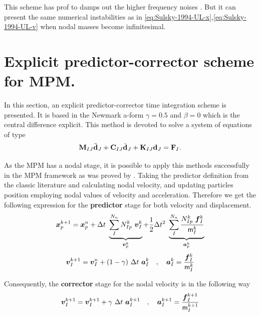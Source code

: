 This scheme has prof to damps out the higher frequency noises
\cite{Tran2019e}. But it can present the same numerical instabilities
as in \eqref{eq:Sulsky-1994-UL-x},\eqref{eq:Sulsky-1994-UL-v} when
nodal masses become infinitesimal.

\section{Explicit predictor-corrector scheme for MPM.}
\label{sec:epc-algor-mpm}

In this section, an explicit predictor-corrector time integration
scheme is presented. It is based in the Newmark a-form 
$\gamma = 0.5$ and $\beta = 0$ which is the central difference
explicit. This method is devoted to solve a system of equations of type
\begin{equation*}
  \mathbf{{M}}_{IJ}\ddot{\mathbf{{d}}}_{J} + \mathbf{{C}}_{IJ}\dot{\mathbf{{d}}}_{J} +
  \mathbf{{K}}_{IJ}\mathbf{{d}}_{J} = \mathbf{{F}}_{I}.
\end{equation*}

As the MPM has a nodal stage, it is possible to apply this methods
successfully in the MPM framework as was proved by
\cite{Tran2019e}. Taking the predictor definition from the classic
literature \cite{Hughes2000} and calculating nodal velocity, and
updating particles position employing nodal values of velocity and
acceleration. Therefore we get the following expression for the
\textbf{predictor} stage for both velocity and displacement.
\begin{equation}
  \label{eq:5}
  \vec{x}_p^{k+1} = \vec{x}_p^n + \Delta t\
  \underbrace{\sum^{N_n}_{I}N_{Ip}^k\ \vec{v}_{I}^{k}}_{\vec{v}_p^{k}} + \frac{1}{2}\Delta
  t^2\ \underbrace{\sum^{N_n}_{I}\frac{N_{Ip}^k\ \vec{f}_{I}^{k}}{\tens{m}_I^k}}_{\vec{a}_p^{k}}
\end{equation}
\begin{equation}
  \label{eq:Predictor-velocity}
  \vec{v}_I^{k+1} = \vec{v}_I^n + (1 - \gamma)\ \Delta t\ \vec{a}_I^k
  \quad , \quad \vec{a}_I^k = \frac{\vec{f}_{I}^{k}}{\tens{m}_I^k}
\end{equation}

Consequently, the \textbf{corrector} stage for the nodal velocity is in the
following way
\begin{equation}
  \vec{v}_{I}^{k+1} = \vec{v}_{I}^{k+1} + \gamma\ \Delta t\
  \vec{a}_I^{k+1} \quad , \quad  \vec{a}_I^{k+1} = \frac{\vec{f}_{I}^{k+1}}{\tens{m}_I^{k+1}} 
\end{equation}

